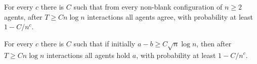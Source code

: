 \begin{theorem}\label{thm:seq-conv}
\leanok
{}
For every $c$ there is $C$ such that from every non-blank configuration of $n\ge2$ agents, after
$T\ge Cn\log n$ interactions all agents agree, with probability at least $1-C/n^c$.
\end{theorem}
\begin{theorem}\label{thm:seq-maj}
\leanok
{}
For every $c$ there is $C$ such that if initially $a-b\ge C\sqrt n\log n$, then after
$T\ge Cn\log n$ interactions all agents hold $a$, with probability at least $1-C/n^c$.
\end{theorem}
